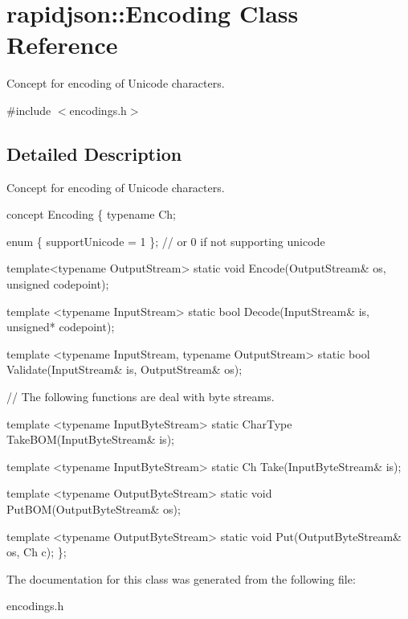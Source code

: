 \hypertarget{a00095}{}\section{rapidjson\+:\+:Encoding Class Reference}
\label{a00095}


Concept for encoding of Unicode characters.  




{\ttfamily \#include $<$encodings.\+h$>$}



\subsection{Detailed Description}
Concept for encoding of Unicode characters. 


\begin{DoxyCode}
concept Encoding \{
    \textcolor{keyword}{typename} Ch;    

    \textcolor{keyword}{enum} \{ supportUnicode = 1 \}; \textcolor{comment}{// or 0 if not supporting unicode}

    \textcolor{keyword}{template}<\textcolor{keyword}{typename} OutputStream>
    \textcolor{keyword}{static} \textcolor{keywordtype}{void} Encode(OutputStream& os, \textcolor{keywordtype}{unsigned} codepoint);

    \textcolor{keyword}{template} <\textcolor{keyword}{typename} InputStream>
    \textcolor{keyword}{static} \textcolor{keywordtype}{bool} Decode(InputStream& is, \textcolor{keywordtype}{unsigned}* codepoint);

    \textcolor{keyword}{template} <\textcolor{keyword}{typename} InputStream, \textcolor{keyword}{typename} OutputStream>
    \textcolor{keyword}{static} \textcolor{keywordtype}{bool} Validate(InputStream& is, OutputStream& os);

    \textcolor{comment}{// The following functions are deal with byte streams.}

    \textcolor{keyword}{template} <\textcolor{keyword}{typename} InputByteStream>
    \textcolor{keyword}{static} CharType TakeBOM(InputByteStream& is);

    \textcolor{keyword}{template} <\textcolor{keyword}{typename} InputByteStream>
    \textcolor{keyword}{static} Ch Take(InputByteStream& is);

    \textcolor{keyword}{template} <\textcolor{keyword}{typename} OutputByteStream>
    \textcolor{keyword}{static} \textcolor{keywordtype}{void} PutBOM(OutputByteStream& os);

    \textcolor{keyword}{template} <\textcolor{keyword}{typename} OutputByteStream>
    \textcolor{keyword}{static} \textcolor{keywordtype}{void} Put(OutputByteStream& os, Ch c);
\};
\end{DoxyCode}
 

The documentation for this class was generated from the following file\+:\begin{DoxyCompactItemize}
\item 
encodings.\+h\end{DoxyCompactItemize}
